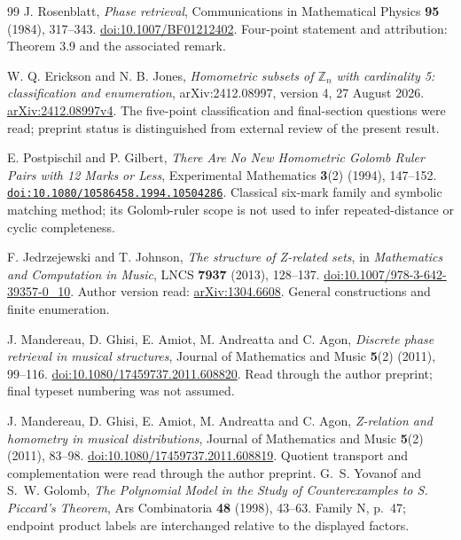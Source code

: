 \documentclass[11pt]{article}
\theoremstyle{remark}
\newcommand{\Z}{\mathbb Z}
\begin{document}
\begin{thebibliography}{99}
\small
{}
J. Rosenblatt, \emph{Phase retrieval}, Communications in Mathematical
Physics \textbf{95} (1984), 317--343.
\href{https://doi.org/10.1007/BF01212402}{doi:10.1007/BF01212402}.
Four-point statement and attribution: Theorem 3.9 and the associated remark.

W. Q. Erickson and N. B. Jones, \emph{Homometric subsets of $\Z_n$ with
cardinality 5: classification and enumeration}, arXiv:2412.08997,
version 4, 27 August 2026.
\href{https://arxiv.org/abs/2412.08997v4}{arXiv:2412.08997v4}.
The five-point classification and final-section questions were read;
preprint status is distinguished from external review of the present result.

E. Postpischil and P. Gilbert, \emph{There Are No New Homometric Golomb
Ruler Pairs with 12 Marks or Less}, Experimental Mathematics
\textbf{3}(2) (1994), 147--152.
\href{https://doi.org/10.1080/10586458.1994.10504286}{\nolinkurl{doi:10.1080/10586458.1994.10504286}}.
Classical six-mark family and symbolic matching method; its Golomb-ruler
scope is not used to infer repeated-distance or cyclic completeness.

F. Jedrzejewski and T. Johnson, \emph{The structure of Z-related sets},
in \emph{Mathematics and Computation in Music}, LNCS \textbf{7937}
(2013), 128--137.
\href{https://doi.org/10.1007/978-3-642-39357-0_10}{doi:10.1007/978-3-642-39357-0\_10}.
Author version read:
\href{https://arxiv.org/abs/1304.6608}{arXiv:1304.6608}.
General constructions and finite enumeration.

J. Mandereau, D. Ghisi, E. Amiot, M. Andreatta and C. Agon,
\emph{Discrete phase retrieval in musical structures}, Journal of
Mathematics and Music \textbf{5}(2) (2011), 99--116.
\href{https://doi.org/10.1080/17459737.2011.608820}{doi:10.1080/17459737.2011.608820}.
Read through the author preprint; final typeset numbering was not assumed.

J. Mandereau, D. Ghisi, E. Amiot, M. Andreatta and C. Agon,
\emph{Z-relation and homometry in musical distributions}, Journal of
Mathematics and Music \textbf{5}(2) (2011), 83--98.
\href{https://doi.org/10.1080/17459737.2011.608819}{doi:10.1080/17459737.2011.608819}.
Quotient transport and complementation were read through the author preprint.
G.~S. Yovanof and S.~W. Golomb,
\emph{The Polynomial Model in the Study of Counterexamples to
S. Piccard's Theorem}, Ars Combinatoria \textbf{48} (1998), 43--63.
Family N, p.~47; endpoint product labels are interchanged relative
to the displayed factors.


\end{thebibliography}
\end{document}
